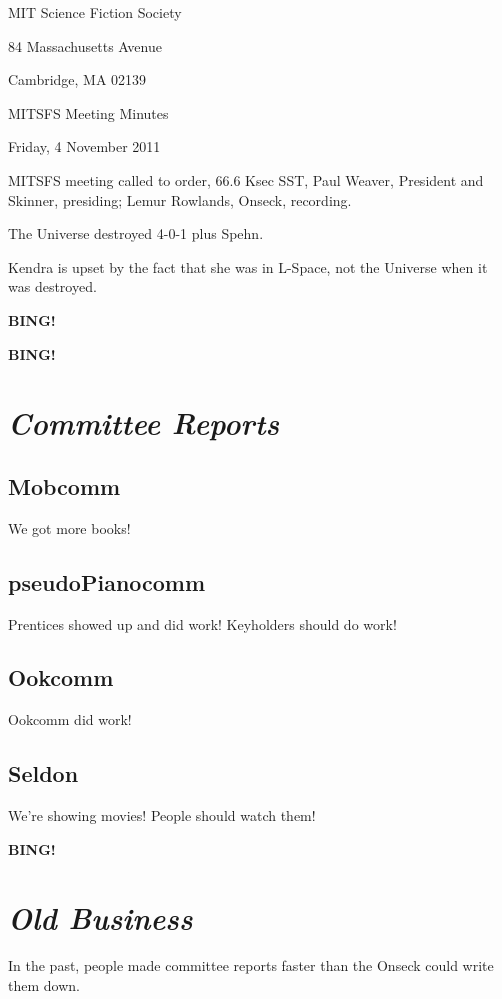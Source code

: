 \documentclass[10pt]{article}
\newcommand{\bing}{{\bf BING!} }
\newcommand{\goto}[1]{\bing \vskip 12pt \section*{{\em{#1}}}}
\newcommand{\ps}{ plus Spehn\xspace}
\newcommand{\skinner}{Paul Weaver, President and Skinner}
\newcommand{\onseck}{Lemur Rowlands, Onseck}
\newcommand{\meetingdate}{Friday, 4 November 2011}
\begin{document}
\begin{center}

MIT Science Fiction Society

84 Massachusetts Avenue

Cambridge, MA 02139

\vspace{12pt}

MITSFS Meeting Minutes

\meetingdate

\end{center}

\vspace{18pt}

\setlength{\parskip}{6pt}

\noindent
MITSFS meeting called to order, 66.6 Ksec SST,
\skinner, presiding; \onseck, recording.

The Universe destroyed 4-0-1\ps.

Kendra is upset by the fact that she was in L-Space, not the 
Universe when it was destroyed.

\bing

\goto{Committee Reports}

\subsection*{Mobcomm}

We got more books!

\subsection*{pseudoPianocomm}

Prentices showed up and did work!  Keyholders should do work!

\subsection*{Ookcomm}

Ookcomm did work!

\subsection*{Seldon}

We're showing movies!  People should watch them!

\goto{Old Business}

In the past, people made committee reports faster than the Onseck
could write them down.
\end{document}
